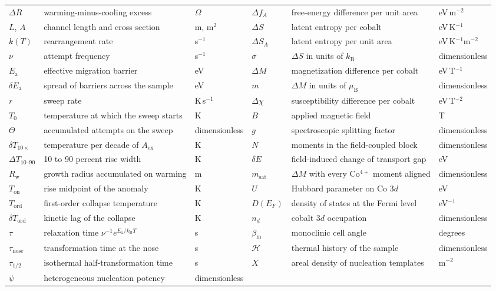 \documentclass[reprint,twocolumn,prb,amsmath,amssymb,superscriptaddress,floatfix]{revtex4-2}
\newcommand{\kB}{k_{\mathrm{B}}}
\newcommand{\muBs}{\mu_{\mathrm{B}}}
\newcommand{\Ea}{E_{\mathrm{a}}}
\newcommand{\Ton}{T_{\mathrm{on}}}
\newcommand{\Tcol}{T_{\mathrm{ord}}}
\begin{document}
\begin{table}[t]
\begin{ruledtabular}
\begin{tabular}{lll@{\qquad}lll}
    $\Delta R$ & warming-minus-cooling excess & $\Omega$ & $\Delta f_{A}$ & free-energy difference per unit area & eV\,m$^{-2}$ \\
    $L$, $A$ & channel length and cross section & m, m$^{2}$ & $\Delta S$ & latent entropy per cobalt & eV\,K$^{-1}$ \\
    $k(T)$ & rearrangement rate & s$^{-1}$ & $\Delta S_{A}$ & latent entropy per unit area & eV\,K$^{-1}$m$^{-2}$ \\
    $\nu$ & attempt frequency & s$^{-1}$ & $\sigma$ & $\Delta S$ in units of $\kB$ & dimensionless \\
    $\Ea$ & effective migration barrier & eV & $\Delta M$ & magnetization difference per cobalt & eV\,T$^{-1}$ \\
    $\delta\Ea$ & spread of barriers across the sample & eV & $m$ & $\Delta M$ in units of $\muBs$ & dimensionless \\
    $r$ & sweep rate & K\,s$^{-1}$ & $\Delta\chi$ & susceptibility difference per cobalt & eV\,T$^{-2}$ \\
    $T_{0}$ & temperature at which the sweep starts & K & $B$ & applied magnetic field & T \\
    $\Theta$ & accumulated attempts on the sweep & dimensionless & $g$ & spectroscopic splitting factor & dimensionless \\
    $\delta T_{10\times}$ & temperature per decade of $A_{\mathrm{ex}}$ & K & $N$ & moments in the field-coupled block & dimensionless \\
    $\Delta T_{10\text{--}90}$ & 10 to 90 percent rise width & K & $\delta E$ & field-induced change of transport gap & eV \\
    $R_{\mathrm{w}}$ & growth radius accumulated on warming & m & $m_{\mathrm{sat}}$ & $\Delta M$ with every Co$^{4+}$ moment aligned & dimensionless \\
    $\Ton$ & rise midpoint of the anomaly & K & $U$ & Hubbard parameter on Co $3d$ & eV \\
    $\Tcol$ & first-order collapse temperature & K & $D(E_{F})$ & density of states at the Fermi level & eV$^{-1}$ \\
    $\delta\Tcol$ & kinetic lag of the collapse & K & $n_{d}$ & cobalt $3d$ occupation & dimensionless \\
    $\tau$ & relaxation time $\nu^{-1}e^{\Ea/\kB T}$ & s & $\beta_{\mathrm{m}}$ & monoclinic cell angle & degrees \\
    $\tau_{\mathrm{nose}}$ & transformation time at the nose & s & $\mathcal{H}$ & thermal history of the sample & dimensionless \\
    $\tau_{1/2}$ & isothermal half-transformation time & s & $X$ & areal density of nucleation templates & m$^{-2}$ \\
    $\psi$ & heterogeneous nucleation potency & dimensionless & & & \\
  \end{tabular}
  \end{ruledtabular}
\end{table}

\clearpage



\end{document}
